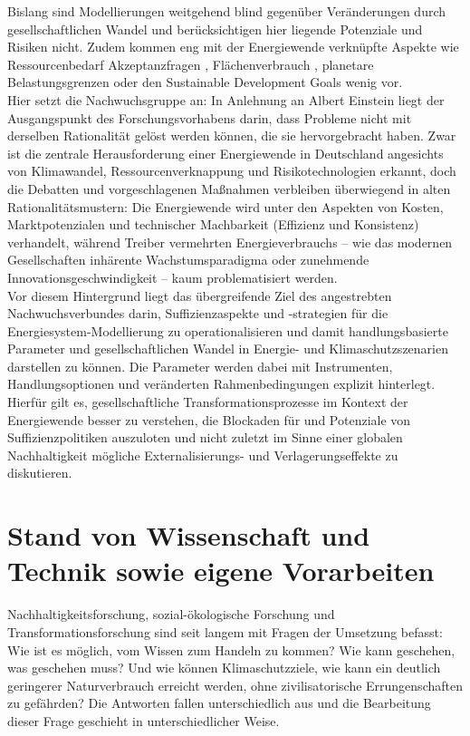 \documentclass[a4paper,11pt,twoside]{scrartcl}
\begin{document}
Bislang sind Modellierungen weitgehend blind gegenüber Veränderungen durch gesellschaftlichen Wandel und berücksichtigen hier liegende Potenziale und Risiken nicht. Zudem kommen eng mit der Energiewende verknüpfte Aspekte wie Ressourcenbedarf \cite{Mocker2015,Buchert2011} Akzeptanzfragen \cite{Fuchs2016}, Flächenverbrauch \cite{Rink2011}, planetare Belastungsgrenzen \cite{Rockstroem2009} oder den Sustainable Development Goals \cite{UN_SDG} wenig vor. \\
Hier setzt die Nachwuchsgruppe an: In Anlehnung an Albert Einstein liegt der Ausgangspunkt des Forschungsvorhabens darin, dass Probleme nicht mit derselben Rationalität gelöst werden können, die sie hervorgebracht haben. Zwar ist die zentrale Herausforderung einer Energiewende in Deutschland angesichts von Klimawandel, Ressourcenverknappung und Risikotechnologien erkannt, doch die Debatten und vorgeschlagenen Maßnahmen verbleiben überwiegend in alten Rationalitätsmustern: Die Energiewende wird unter den Aspekten von Kosten, Marktpotenzialen und technischer Machbarkeit (Effizienz und Konsistenz) verhandelt, während Treiber vermehrten Energieverbrauchs – wie das modernen Gesellschaften inhärente Wachstumsparadigma oder zunehmende Innovationsgeschwindigkeit – kaum problematisiert werden.\\
Vor diesem Hintergrund liegt das übergreifende Ziel des angestrebten Nachwuchsverbundes darin, Suffizienzaspekte und -strategien für die Energiesystem-Modellierung zu operationalisieren und damit handlungsbasierte Parameter und gesellschaftlichen Wandel in Energie- und Klimaschutzszenarien darstellen zu können. Die Parameter werden dabei mit Instrumenten, Handlungsoptionen und veränderten Rahmenbedingungen explizit hinterlegt. Hierfür gilt es, gesellschaftliche Transformationsprozesse im Kontext der Energiewende besser zu verstehen, die Blockaden für und Potenziale von Suffizienzpolitiken auszuloten und nicht zuletzt im Sinne einer globalen Nachhaltigkeit mögliche Externalisierungs- und Verlagerungseffekte zu diskutieren. 

\section{Stand von Wissenschaft und Technik sowie eigene Vorarbeiten}
\label{sec:2}
Nachhaltigkeitsforschung, sozial-ökologische Forschung und Transformationsforschung sind seit langem mit Fragen der Umsetzung befasst: Wie ist es möglich, vom Wissen zum Handeln zu kommen? \cite{BMBF2008} Wie kann geschehen, was geschehen muss? \cite{Linz2000} Und wie können Klimaschutzziele, wie kann ein deutlich geringerer Naturverbrauch erreicht werden, ohne zivilisatorische Errungenschaften zu gefährden? \cite{Sommer2016,WGBU2011} Die Antworten fallen unterschiedlich aus und die Bearbeitung dieser Frage geschieht in unterschiedlicher Weise.
\end{document}
